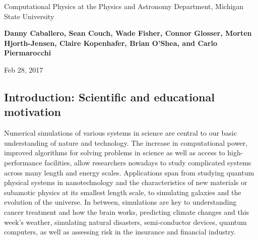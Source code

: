 \documentclass[%
oneside,                 %
final,                   %
10pt]{article}
\begin{document}

\newcommand{\exercisesection}[1]{\subsection*{#1}}






\thispagestyle{empty}

\begin{center}
{\LARGE\bf
\begin{spacing}{1.25}
Computational Physics at the Physics and Astronomy Department, Michigan State University
\end{spacing}
}
\end{center}


\begin{center}
{\bf Danny Caballero, Sean Couch, Wade Fisher, Connor Glosser, Morten Hjorth-Jensen, Claire Kopenhafer, Brian O'Shea, and Carlo Piermarocchi${}^{}$} \\ [0mm]
\end{center}

\begin{center}
\end{center}
    

\begin{center}
Feb 28, 2017
\end{center}

\vspace{1cm}


\subsection*{Introduction: Scientific and educational motivation}

Numerical simulations of various systems in science are central to our
basic understanding of nature and technology.
The increase in computational power,
improved algorithms for solving problems in science as well as access
to high-performance facilities, allow researchers nowadays to study
complicated systems across many length and energy scales. Applications
span from studying quantum physical systems in nanotechnology and the
characteristics of new materials or subamotic physics at its smallest
length scale, to simulating galaxies and the evolution of the universe.
In between, simulations are key to understanding
cancer treatment and how the brain works,
predicting climate changes and this week's weather,
simulating natural disasters, semi-conductor devices,
quantum computers, as well as assessing risk in the insurance and
financial industry. 
\end{document}

